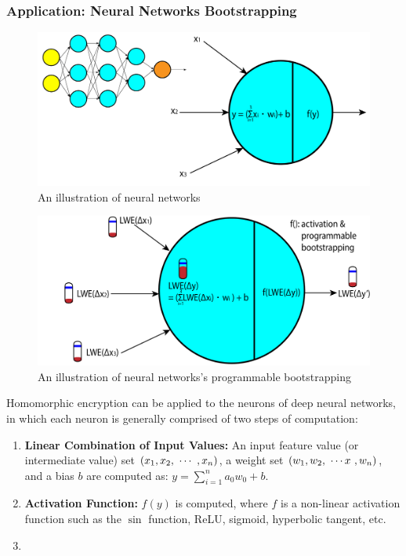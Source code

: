 \subsubsection{Application: Neural Networks Bootstrapping}
\label{subsec:tfhe-neural-network}

\begin{figure}[h!]
    \centering
  \includegraphics[width=0.8\linewidth]{figures/neural-network.pdf}
  \caption{An illustration of neural networks }
  \label{fig:neural-network}
\end{figure}

\begin{figure}[h!]
    \centering
  \includegraphics[width=0.8\linewidth]{figures/nn-homomorphic.pdf}
  \caption{An illustration of neural networks's programmable bootstrapping}
  \label{fig:neural-network2}
\end{figure}

Homomorphic encryption can be applied to the neurons of deep neural networks, in which each neuron is generally comprised of two steps of computation: 

\begin{enumerate}
\item \textbf{Linear Combination of Input Values:} An input feature value (or intermediate value) set $(x_1, x_2, \text{ } \text{$\cdots$} \text{ }, x_n)$, a weight set $(w_1, w_2, \text{ } \text{$\cdots x$} \text{ }, w_n)$, and a bias $b$ are computed as: $y = \sum\limits_{i=1}^{n}a_0w_0 + b$. 
\item \textbf{Activation Function:} $f(y)$ is computed, where $f$ is a non-linear activation function such as the $\sin$ function, ReLU, sigmoid, hyperbolic tangent, etc. 
\item 
\end{enumerate}

